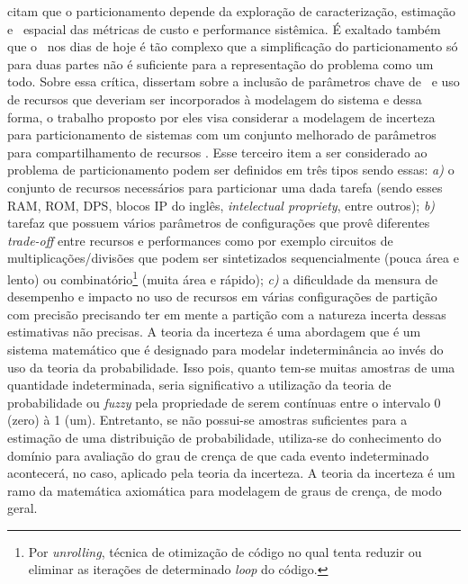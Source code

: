	\cite{Wang2016} citam que o particionamento depende da exploração de caracterização, estimação e \design\ espacial das métricas de custo e performance sistêmica. É exaltado também que o \codesign\ nos dias de hoje é tão complexo que a simplificação do particionamento só para duas partes não é suficiente para a representação do problema como um todo. Sobre essa crítica, dissertam sobre a inclusão de parâmetros chave de \design\ e uso de recursos que deveriam ser incorporados à modelagem do sistema e dessa forma, o trabalho proposto por eles visa considerar a modelagem de incerteza para particionamento de sistemas com um conjunto melhorado de parâmetros para compartilhamento de recursos \hs.
	Esse terceiro item a ser considerado ao problema de particionamento podem ser definidos em três tipos sendo essas: \textit{a)} o conjunto de recursos necessários para particionar uma dada tarefa (sendo esses RAM, ROM, DPS, blocos IP do inglês, \textit{intelectual propriety}, entre outros); \textit{b)} tarefaz que possuem vários parâmetros de configurações que provê diferentes \textit{trade-off} entre recursos e performances como por exemplo circuitos de multiplicações/divisões que podem ser sintetizados sequencialmente (pouca área e lento) ou combinatório\footnote{Por \textit{unrolling}, técnica de otimização de código no qual tenta reduzir ou eliminar as iterações de determinado \textit{loop} do código.} (muita área e rápido); \textit{c)} a dificuldade da mensura de desempenho e impacto no uso de recursos em várias configurações de partição com precisão precisando ter em mente a partição com a natureza incerta dessas estimativas não precisas.
	A teoria da incerteza é uma abordagem que é um sistema matemático que é designado para modelar indeterminância ao invés do uso da teoria da probabilidade. Isso pois, quanto tem-se muitas amostras de uma quantidade indeterminada, seria significativo a utilização da teoria de probabilidade ou \textit{fuzzy} pela propriedade de serem contínuas entre o intervalo 0 (zero) à 1 (um). Entretanto, se não possui-se amostras suficientes para a estimação de uma distribuição de probabilidade, utiliza-se do conhecimento do domínio para avaliação do grau de crença de que cada evento indeterminado acontecerá, no caso, aplicado pela teoria da incerteza. A teoria da incerteza é um ramo da matemática axiomática para modelagem de graus de crença, de modo geral.

